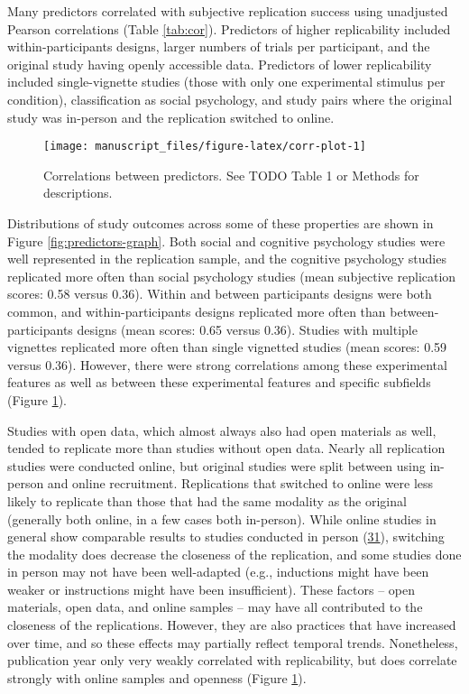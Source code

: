 \documentclass[
  english,
  a4paper,
]{article}
\begin{document}
Many predictors correlated with subjective replication success using unadjusted Pearson correlations (Table \ref{tab:cor}). Predictors of higher replicability included within-participants designs, larger numbers of trials per participant, and the original study having openly accessible data. Predictors of lower replicability included single-vignette studies (those with only one experimental stimulus per condition), classification as social psychology, and study pairs where the original study was in-person and the replication switched to online.

\begin{figure}[ht]
\texttt{[image: manuscript\_files/figure-latex/corr-plot-1]} \caption{Correlations between predictors. See TODO Table 1 or Methods for descriptions. }\label{fig:corr-plot}
\end{figure}

Distributions of study outcomes across some of these properties are shown in Figure \ref{fig:predictors-graph}. Both social and cognitive psychology studies were well represented in the replication sample, and the cognitive psychology studies replicated more often than social psychology studies (mean subjective replication scores: 0.58 versus 0.36). Within and between participants designs were both common, and within-participants designs replicated more often than between-participants designs (mean scores: 0.65 versus 0.36). Studies with multiple vignettes replicated more often than single vignetted studies (mean scores: 0.59 versus 0.36). However, there were strong correlations among these experimental features as well as between these experimental features and specific subfields (Figure \ref{fig:corr-plot}).

Studies with open data, which almost always also had open materials as well, tended to replicate more than studies without open data. Nearly all replication studies were conducted online, but original studies were split between using in-person and online recruitment. Replications that switched to online were less likely to replicate than those that had the same modality as the original (generally both online, in a few cases both in-person). While online studies in general show comparable results to studies conducted in person (\protect\hyperlink{ref-crump2013}{31}), switching the modality does decrease the closeness of the replication, and some studies done in person may not have been well-adapted (e.g., inductions might have been weaker or instructions might have been insufficient). These factors -- open materials, open data, and online samples -- may have all contributed to the closeness of the replications. However, they are also practices that have increased over time, and so these effects may partially reflect temporal trends. Nonetheless, publication year only very weakly correlated with replicability, but does correlate strongly with online samples and openness (Figure \ref{fig:corr-plot}).
\end{document}

